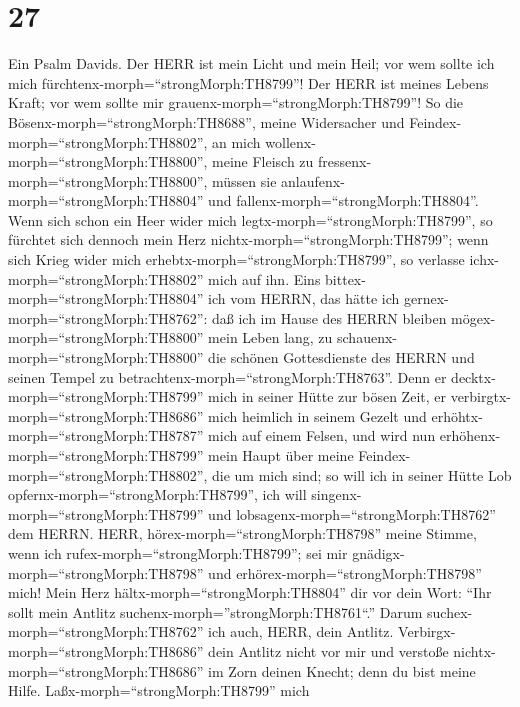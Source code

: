 \hypertarget{section-26}{%
\section{27}\label{section-26}}

 Ein Psalm Davids. Der HERR ist mein Licht und mein Heil;
vor wem sollte ich mich fürchtenx-morph=``strongMorph:TH8799''! Der HERR
ist meines Lebens Kraft; vor wem sollte mir
grauenx-morph=``strongMorph:TH8799''!  So die
Bösenx-morph=``strongMorph:TH8688'', meine Widersacher und
Feindex-morph=``strongMorph:TH8802'', an mich
wollenx-morph=``strongMorph:TH8800'', meine Fleisch zu
fressenx-morph=``strongMorph:TH8800'', müssen sie
anlaufenx-morph=``strongMorph:TH8804'' und
fallenx-morph=``strongMorph:TH8804''.  Wenn sich schon ein
Heer wider mich legtx-morph=``strongMorph:TH8799'', so fürchtet sich
dennoch mein Herz nichtx-morph=``strongMorph:TH8799''; wenn sich Krieg
wider mich erhebtx-morph=``strongMorph:TH8799'', so verlasse
ichx-morph=``strongMorph:TH8802'' mich auf ihn.  Eins
bittex-morph=``strongMorph:TH8804'' ich vom HERRN, das hätte ich
gernex-morph=``strongMorph:TH8762'': daß ich im Hause des HERRN bleiben
mögex-morph=``strongMorph:TH8800'' mein Leben lang, zu
schauenx-morph=``strongMorph:TH8800'' die schönen Gottesdienste des
HERRN und seinen Tempel zu betrachtenx-morph=``strongMorph:TH8763''.
 Denn er decktx-morph=``strongMorph:TH8799'' mich in seiner
Hütte zur bösen Zeit, er verbirgtx-morph=``strongMorph:TH8686'' mich
heimlich in seinem Gezelt und erhöhtx-morph=``strongMorph:TH8787'' mich
auf einem Felsen,  und wird nun
erhöhenx-morph=``strongMorph:TH8799'' mein Haupt über meine
Feindex-morph=``strongMorph:TH8802'', die um mich sind; so will ich in
seiner Hütte Lob opfernx-morph=``strongMorph:TH8799'', ich will
singenx-morph=``strongMorph:TH8799'' und
lobsagenx-morph=``strongMorph:TH8762'' dem HERRN.  HERR,
hörex-morph=``strongMorph:TH8798'' meine Stimme, wenn ich
rufex-morph=``strongMorph:TH8799''; sei mir
gnädigx-morph=``strongMorph:TH8798'' und
erhörex-morph=``strongMorph:TH8798'' mich!  Mein Herz
hältx-morph=``strongMorph:TH8804'' dir vor dein Wort: ``Ihr sollt mein
Antlitz suchenx-morph=''strongMorph:TH8761``.'' Darum
suchex-morph=``strongMorph:TH8762'' ich auch, HERR, dein Antlitz.
 Verbirgx-morph=``strongMorph:TH8686'' dein Antlitz nicht
vor mir und verstoße nichtx-morph=``strongMorph:TH8686'' im Zorn deinen
Knecht; denn du bist meine Hilfe. Laßx-morph=``strongMorph:TH8799'' mich

